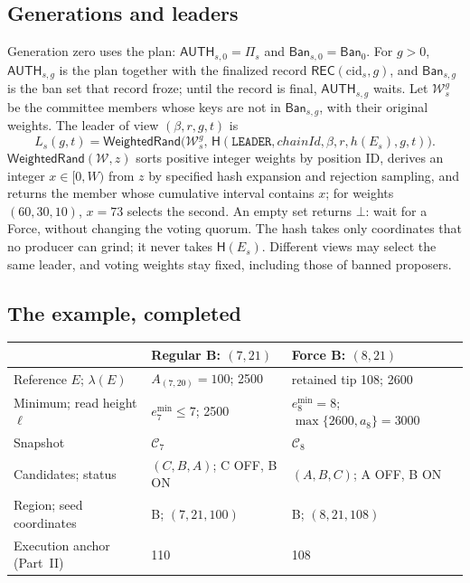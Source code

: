 \documentclass[11pt,a4paper]{article}
\newcommand{\Hash}{\mathsf H}
\newcommand{\tagg}[1]{\mathsf{#1}}
\newcommand{\cfg}{\mathcal C}
\newcommand{\Ban}{\mathsf{Ban}}
\newcommand{\emin}{e^{\min}}
\newcommand{\cid}{\mathrm{cid}}
\begin{document}
\subsection{Generations and leaders}
\label{sec:leaders}
Generation zero uses the plan: $\tagg{AUTH}_{s,0}=\Pi_s$ and
$\Ban_{s,0}=\Ban_0$. For $g>0$, $\tagg{AUTH}_{s,g}$ is the plan together
with the finalized record $\tagg{REC}(\cid_s,g)$, and $\Ban_{s,g}$ is the
ban set that record froze; until the record is final,
$\tagg{AUTH}_{s,g}$ waits. Let $\mathcal W^g_s$ be the committee members
whose keys are not in $\Ban_{s,g}$, with their original weights. The
leader of view $(\beta,r,g,t)$ is
\begin{equation}\label{eq:leader}
 L_s(g,t)=\tagg{WeightedRand}\bigl(\mathcal W^g_s,\,
 \Hash(\texttt{LEADER},\mathit{chainId},\beta,r,h(E_s),g,t)\bigr).
\end{equation}
$\tagg{WeightedRand}(\mathcal W,z)$ sorts positive integer weights by
position ID, derives an integer $x\in[0,W)$ from $z$ by specified hash
expansion and rejection sampling, and returns the member whose cumulative
interval contains $x$; for weights $(60,30,10)$, $x=73$ selects the
second. An empty set returns $\bot$: wait for a Force, without changing
the voting quorum. The hash takes only coordinates that no producer can
grind; it never takes $\Hash(E_s)$. Different views may select the same
leader, and voting weights stay fixed, including those of banned
proposers.

\subsection{The example, completed}
\label{sec:example}
\begin{tabularx}{\linewidth}{@{}>{\raggedright\arraybackslash}p{.27\linewidth}YY@{}}\toprule
 & Regular B: $(7,21)$ & Force B: $(8,21)$\\\midrule
Reference $E$; $\lambda(E)$ & $A_{(7,20)}=100$; 2500 & retained tip 108; 2600\\
Minimum; read height $\ell$ & $\emin_7\le7$; 2500 & $\emin_8=8$; $\max\{2600,a_8\}=3000$\\
Snapshot & $\cfg_7$ & $\cfg_8$\\
Candidates; status & $(C,B,A)$; C OFF, B ON & $(A,B,C)$; A OFF, B ON\\
Region; seed coordinates & B; $(7,21,100)$ & B; $(8,21,108)$\\
Execution anchor (Part~II) & 110 & 108\\\bottomrule
\end{tabularx}
\end{document}
